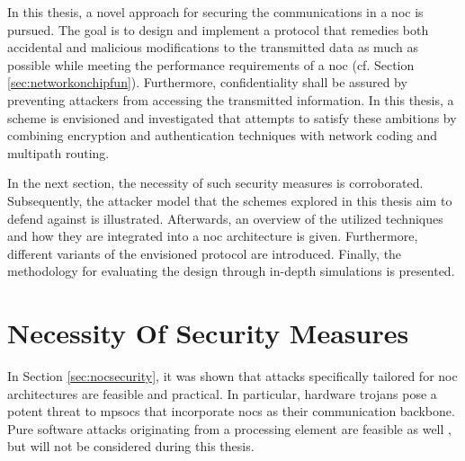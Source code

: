 In this thesis, a novel approach for securing the communications in a \gls{noc} is pursued. The goal is to design and implement a protocol that
remedies both accidental and malicious modifications to the transmitted data as much as possible while meeting the performance requirements of a \gls{noc} (cf. Section
\ref{sec:networkonchipfun}). Furthermore, confidentiality shall be assured by preventing attackers from accessing the transmitted information. In this
thesis, a scheme is envisioned and investigated that attempts to satisfy these ambitions by combining encryption and authentication techniques with
network coding and multipath routing.

In the next section, the necessity of such security measures is corroborated. Subsequently, the attacker model that the schemes explored in this
thesis aim to defend against is illustrated. Afterwards, an overview of the utilized techniques and how they are
integrated into a \gls{noc} architecture is given. Furthermore, different variants of the envisioned protocol are introduced. Finally, the
methodology for evaluating the design through in-depth simulations is presented.

\section{Necessity Of Security Measures}\label{sec:necessityofsecurity}
In Section \ref{sec:nocsecurity}, it was shown that attacks specifically tailored for \gls{noc} architectures are feasible and practical. In
particular, hardware trojans pose a potent threat to \glspl{mpsoc} that incorporate \glspl{noc} as their communication backbone. Pure software attacks
originating from a processing element are feasible as well \cites(e.g.)(){biswas15routerattack}{kocher04embeddedsecurity}, but will not be considered
during this thesis. %

